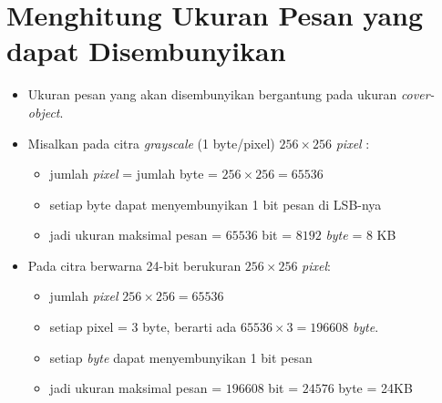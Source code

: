 \documentclass{article}
\begin{document}

\section*{Menghitung Ukuran Pesan yang dapat Disembunyikan}

\begin{itemize}
    \item Ukuran pesan yang akan disembunyikan bergantung pada ukuran \textit{cover-object}.
    \item Misalkan pada citra \textit{grayscale} (1 byte/pixel) $256 \times 256$ \textit{pixel} :
    \begin{itemize}
        \item jumlah \textit{pixel} = jumlah byte = $256 \times 256 = 65536$
        \item setiap byte dapat menyembunyikan 1 bit pesan di LSB-nya
        \item jadi ukuran maksimal pesan = $65536$ bit = $8192$ \textit{byte} = 8 KB
    \end{itemize}
    \item Pada citra berwarna 24-bit berukuran $256 \times 256$ \textit{pixel}:
    \begin{itemize}
        \item jumlah \textit{pixel} $256 \times 256 = 65536$
        \item setiap pixel = 3 byte, berarti ada $65536 \times 3 = 196608$ \textit{byte}.
        \item setiap \textit{byte} dapat menyembunyikan 1 bit pesan
        \item jadi ukuran maksimal pesan = $196608$ bit = $24576$ byte = 24KB
    \end{itemize}
\end{itemize}
\end{document}
